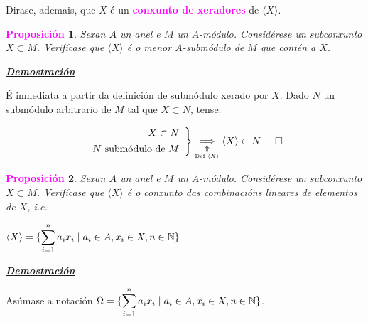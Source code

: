 \documentclass[twoside]{report}
\newcommand{\magbf}[1]{\textcolor{magenta}{\textbf{#1}}} %
\theoremstyle{mystyle}
\newtheorem{prop}{\magbf{Proposición}}[chapter]
\newenvironment{proposition}
{\begin{mdframed}[linecolor = magenta,backgroundcolor = classicrose, linewidth = 2mm]\begin{prop}}
{\end{prop}\end{mdframed}}
\begin{document}
\noindent Dirase, ademais, que $X$ é un \magbf{conxunto de xeradores} de $\langle X \rangle$.\\

\begin{proposition} \label{prop3.2}
Sexan $A$ un anel e $M$ un $A$-módulo. Considérese un subconxunto $X \subset M$. Verifícase que $\langle X \rangle$ é o menor $A$-submódulo de $M$ que contén a $X$.
\end{proposition}

\vspace{2mm}

\noindent \textbf{\textit{\underline{Demostración}}}

\vspace{2mm}

\noindent É inmediata a partir da definición de submódulo xerado por $X$. Dado $N$ un submódulo arbitrario de $M$ tal que $X \subset N$, tense:

    \[ 
    \left. \begin{array}{r} 
    X \subset N  \\[1ex]
    N \text{ submódulo de } M
    \end{array} \right\} 
    \underset{\underset{\text{Def } \langle X \rangle}{\Uparrow}}{\implies} \langle X \rangle \subset N \hspace{5mm} \square
    \]
  
\begin{proposition} \label{prop3.3}
Sexan $A$ un anel e $M$ un $A$-módulo. Considérese un subconxunto $X \subset M$. Verifícase que $\langle X \rangle$ é o conxunto das combinacións lineares de elementos de $X$, i.e. 
\begin{center}
$\langle X \rangle = \{\displaystyle \sum_{i = 1}^{n}a_{i}x_{i} \hspace{1mm} | \hspace{1mm} a_{i} \in A, x_{i} \in X, n \in \mathbb{N}\}$
\end{center}
\end{proposition} 

\vspace{2mm}

\noindent \textbf{\textit{\underline{Demostración}}}

\vspace{2mm}

\noindent Asúmase a notación $\Omega = \{\displaystyle \sum_{i = 1}^{n}a_{i}x_{i} \hspace{1mm} | \hspace{1mm} a_{i} \in A, x_{i} \in X, n \in \mathbb{N}\}$. \\
\end{document}
